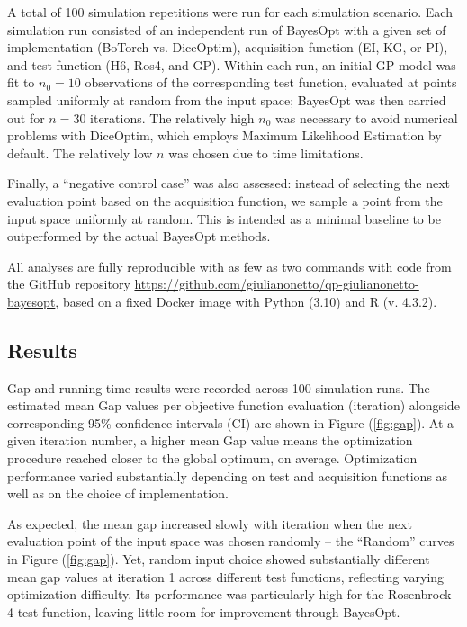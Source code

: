 A total of 100 simulation repetitions were run for each simulation scenario. Each simulation run consisted of an independent run of BayesOpt with a given set of implementation (BoTorch vs. DiceOptim), acquisition function (EI, KG, or PI), and test function (H6, Ros4, and GP). Within each run, an initial GP model was fit to $n_0=10$ observations of the corresponding test function, evaluated at points sampled uniformly at random from the input space; BayesOpt was then carried out for $n=30$ iterations. The relatively high $n_0$ was necessary to avoid numerical problems with DiceOptim, which employs Maximum Likelihood Estimation by default. The relatively low $n$ was chosen due to time limitations.

Finally, a ``negative control case'' was also assessed: instead of selecting the next evaluation point based on the acquisition function, we sample a point from the input space uniformly at random. This is intended as a minimal baseline to be outperformed by the actual BayesOpt methods.

All analyses are fully reproducible with as few as two commands with code from the GitHub repository \href{https://github.com/giulianonetto/qp-giulianonetto-bayesopt}{https://github.com/giulianonetto/qp-giulianonetto-bayesopt}, based on a fixed Docker image \cite{merkel2014} with Python (3.10) and R (v. 4.3.2).
\subsection{Results}
Gap and running time results were recorded across 100 simulation runs. The estimated mean Gap values per objective function evaluation (iteration) alongside corresponding 95\% confidence intervals (CI) are shown in Figure (\ref{fig:gap}). At a given iteration number, a higher mean Gap value means the optimization procedure reached closer to the global optimum, on average. Optimization performance varied substantially depending on test and acquisition functions as well as on the choice of implementation.

As expected, the mean gap increased slowly with iteration when the next evaluation point of the input space was chosen randomly -- the ``Random'' curves in Figure (\ref{fig:gap}). Yet, random input choice showed substantially different mean gap values at iteration 1 across different test functions, reflecting varying optimization difficulty. Its performance was particularly high for the Rosenbrock 4 test function, leaving little room for improvement through BayesOpt.

